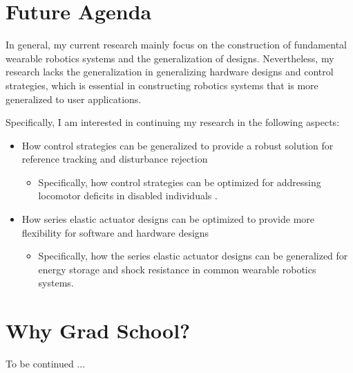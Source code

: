 \documentclass[8pt]{article}
\begin{document}
    

\section{Future Agenda} \label{sec:Agenda}

In general, my current research mainly focus on the construction of fundamental wearable robotics systems and the generalization of designs. Nevertheless, my research lacks the generalization in generalizing hardware designs and control strategies, which is essential in constructing robotics systems that is more generalized to user applications. 

Specifically, I am interested in continuing my research in the following aspects:

\begin{itemize}

    \item {How control strategies can be generalized to provide a robust solution for reference tracking and disturbance rejection}
    \begin{itemize}
        \item {Specifically, how control strategies can be optimized for addressing locomotor deficits in disabled individuals \cite{OSL2020}. }
    \end{itemize}
    \item {How series elastic actuator designs can be optimized to provide more flexibility for software and hardware designs}
    \begin{itemize}
        \item {Specifically, how the series elastic actuator designs can be generalized for energy storage and shock resistance in common wearable robotics systems.}
    \end{itemize}

\end{itemize}



\section{Why Grad School?} \label{sec:GradSchool}
To be continued ... 



\end{document}
